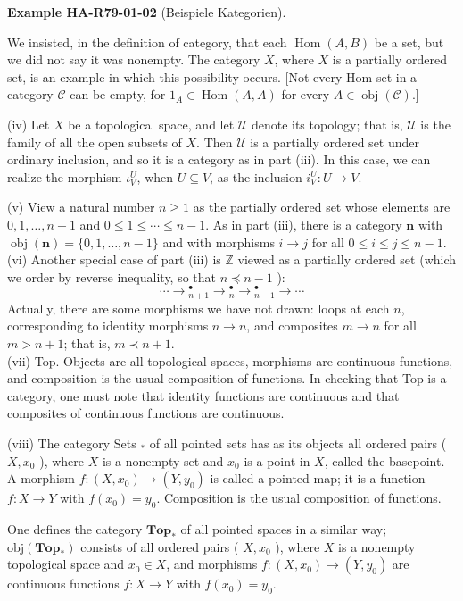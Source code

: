 \documentclass[10pt, letterpaper]{article}
\newcommand{\CustomHeading}[3]{%
  \par\medskip\noindent%
  \textbf{#1 #2} \textnormal{(#3)}.\enskip%
}
\newenvironment{EXA}[2]{\begin{unitbox}\CustomHeading{Example}{#1}{#2}}{\end{unitbox}}
\begin{document}
\begin{EXA}{HA-R79-01-02}{Beispiele Kategorien}
We insisted, in the definition of category, that each $\operatorname{Hom}(A, B)$ be a set, but we did not say it was nonempty. The category $X$, where $X$ is a partially ordered set, is an example in which this possibility occurs. [Not every Hom set in a category $\mathcal{C}$ can be empty, for $1_{A} \in \operatorname{Hom}(A, A)$ for every $A \in \operatorname{obj}(\mathcal{C})$.]


(iv) Let $X$ be a topological space, and let $\mathcal{U}$ denote its topology; that is, $\mathcal{U}$ is the family of all the open subsets of $X$. Then $\mathcal{U}$ is a partially ordered set under ordinary inclusion, and so it is a category as in part (iii). In this case, we can realize the morphism $\iota_{V}^{U}$, when $U \subseteq V$, as the inclusion $i_{V}^{U}: U \rightarrow V$.

(v) View a natural number $n \geq 1$ as the partially ordered set whose elements are $0,1, \ldots, n-1$ and $0 \leq 1 \leq \cdots \leq n-1$. As in part (iii), there is a category $\mathbf{n}$ with $\operatorname{obj}(\mathbf{n})=\{0,1, \ldots, n-1\}$ and with morphisms $i \rightarrow j$ for all $0 \leq i \leq j \leq n-1$.\\


(vi) Another special case of part (iii) is $\mathbb{Z}$ viewed as a partially ordered set (which we order by reverse inequality, so that $n \preceq n-1$ ):
$$
\cdots \longrightarrow{ }_{n+1}^{\bullet} \longrightarrow{ }_{n}^{\bullet} \longrightarrow{ }_{n-1}^{\bullet} \longrightarrow \cdots
$$
Actually, there are some morphisms we have not drawn: loops at each $n$, corresponding to identity morphisms $n \rightarrow n$, and composites $m \rightarrow n$ for all $m>n+1$; that is, $m \prec n+1$.\\
(vii) Top. Objects are all topological spaces, morphisms are continuous functions, and composition is the usual composition of functions. In checking that Top is a category, one must note that identity functions are continuous and that composites of continuous functions are continuous.


(viii) The category Sets ${ }_{*}$ of all pointed sets has as its objects all ordered pairs ( $X, x_{0}$ ), where $X$ is a nonempty set and $x_{0}$ is a point in $X$, called the basepoint. A morphism $f:\left(X, x_{0}\right) \rightarrow\left(Y, y_{0}\right)$ is called a pointed map; it is a function $f: X \rightarrow Y$ with $f\left(x_{0}\right)=y_{0}$. Composition is the usual composition of functions.

One defines the category $\mathbf{T o p}_{*}$ of all pointed spaces in a similar way; $\mathrm{obj}\left(\mathbf{T o p}_{*}\right)$ consists of all ordered pairs ( $X, x_{0}$ ), where $X$ is a nonempty topological space and $x_{0} \in X$, and morphisms $f:\left(X, x_{0}\right) \rightarrow\left(Y, y_{0}\right)$ are continuous functions $f: X \rightarrow Y$ with $f\left(x_{0}\right)=y_{0}$.







\end{EXA}
\end{document}
